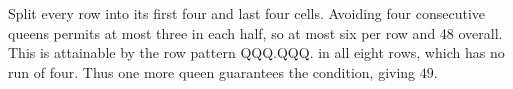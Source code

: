 Split every row into its first four and last four cells. Avoiding four consecutive queens permits at most three in each half, so at most six per row and 48 overall. This is attainable by the row pattern QQQ.QQQ. in all eight rows, which has no run of four. Thus one more queen guarantees the condition, giving $\boxed{49}$.
